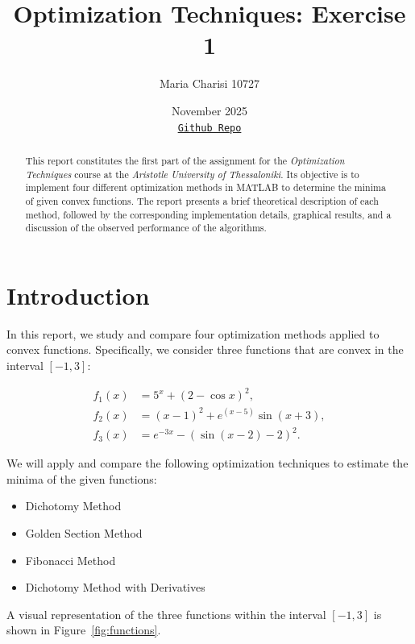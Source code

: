 \documentclass[11pt]{article}
\title{Optimization Techniques: Exercise 1}
\author{Maria Charisi 10727}
\date{November 2025\\ 
\href{https://github.com/mariaxarisi/Optimization-Techniques}{\texttt{Github Repo}}}
\begin{document}
\maketitle

\begin{abstract}
This report constitutes the first part of the assignment for the \textit{Optimization Techniques} course at the \textit{Aristotle University of Thessaloniki}. Its objective is to implement four different optimization methods in MATLAB to determine the minima of given convex functions. The report presents a brief theoretical description of each method, followed by the corresponding implementation details, graphical results, and a discussion of the observed performance of the algorithms.
\end{abstract}

\tableofcontents
\newpage

\section{Introduction}

In this report, we study and compare four optimization methods applied to convex functions. Specifically, we consider three functions that are convex in the interval $[-1, 3]$:

\begin{align}
    f_1(x) &= 5^{x} + (2 - \cos{x})^2, \\
    f_2(x) &= (x - 1)^2 + e^{(x - 5)} \sin{(x + 3)}, \\
    f_3(x) &= e^{-3x} - (\sin{(x - 2)} - 2)^2.
\end{align}

We will apply and compare the following optimization techniques to estimate the minima of the given functions:
\begin{itemize}
    \item Dichotomy Method
    \item Golden Section Method
    \item Fibonacci Method
    \item Dichotomy Method with Derivatives
\end{itemize}

A visual representation of the three functions within the interval $[-1, 3]$ is shown in Figure~\ref{fig:functions}.
\end{document}
